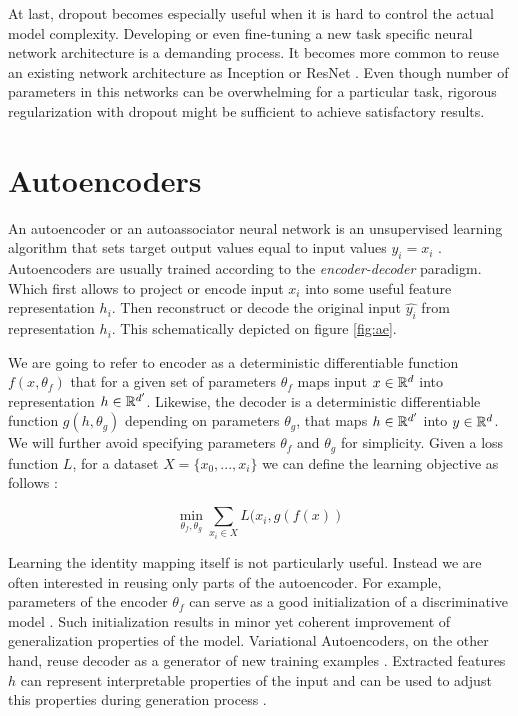 At last, dropout becomes especially useful when it is hard to control the actual model complexity. Developing or even fine-tuning a new task specific neural network architecture is a demanding process. It becomes more common to reuse an existing network architecture as Inception or ResNet \cite{He2015, Szegedy2016}. Even though number of parameters in this networks can be overwhelming for a particular task, rigorous regularization with dropout might be sufficient to achieve satisfactory results.


\section{Autoencoders}\label{ch:ae}
An autoencoder or an autoassociator neural network is an unsupervised learning algorithm that sets target output values equal to input values $y_i=x_i$ \cite{Ng2011,RanzatoMarcAurelio2007}.
Autoencoders are usually trained according to the \textit{encoder-decoder} paradigm.
Which first allows to project or encode input $x_i$ into some useful feature representation $h_i$.
Then reconstruct or decode the original input $\hat{y_i}$ from representation $h_i$.
This schematically depicted on figure \ref{fig:ae}.





We are going to refer to encoder as a deterministic differentiable function $f(x, \theta_f)$ that for a given set of parameters $\theta_f$ maps input $x\in \Bbb{R}^d$ into representation $h \in \Bbb{R}^{d'}$.
Likewise, the decoder is a deterministic differentiable function $g(h, \theta_g)$ depending on parameters $\theta_g$, that maps $h\in\Bbb{R}^{d'}$ into $y\in \Bbb{R}^d$. We will further avoid specifying parameters $\theta_f$ and $\theta_g$ for simplicity.
Given a loss function $L$, for a dataset $X=\{x_0, ..., x_i\}$ we can define the learning objective as follows \cite{Good2016}:

\begin{equation}\label{eq:ae}
\min_{\theta_f, \theta_g}\sum\limits_{x_i \in X}{L(x_i, g(f(x))}
\end{equation}

Learning the identity mapping itself is not particularly useful.
Instead we are often interested in reusing only parts of the autoencoder.
For example, parameters of the encoder $\theta_f$ can serve as a good initialization of a discriminative model \cite{Masci2011, Vincent2010, Zhao2015}.
Such initialization results in minor yet coherent improvement of generalization properties of the model.
Variational Autoencoders, on the other hand, reuse decoder as a generator of new training examples \cite{Kingma2013}.
Extracted features $h$ can represent interpretable properties of the input and can be used to adjust this
properties during generation process \cite{Kulkarni2015, Whitney2016}.

